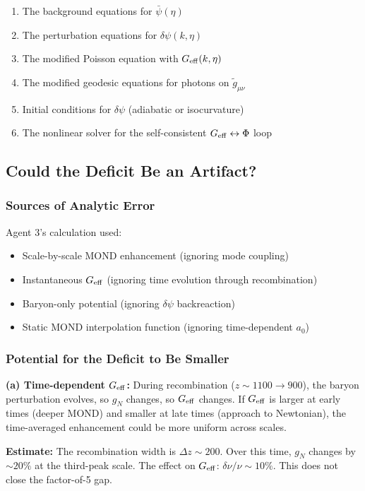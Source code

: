 \documentclass[11pt,a4paper]{article}
\begin{document}
\begin{enumerate}
\item The background equations for $\bar{\psi}(\eta)$
\item The perturbation equations for $\delta\psi(k,\eta)$
\item The modified Poisson equation with $G_{\rm eff}(k,\eta)$
\item The modified geodesic equations for photons on $\tilde{g}_{\mu\nu}$
\item Initial conditions for $\delta\psi$ (adiabatic or isocurvature)
\item The nonlinear solver for the self-consistent $G_{\rm eff} \leftrightarrow \Phi$ loop
\end{enumerate}

\subsection{Could the Deficit Be an Artifact?}

\subsubsection{Sources of Analytic Error}

Agent 3's calculation used:
\begin{itemize}
\item Scale-by-scale MOND enhancement (ignoring mode coupling)
\item Instantaneous $G_{\rm eff}$ (ignoring time evolution through recombination)
\item Baryon-only potential (ignoring $\delta\psi$ backreaction)
\item Static MOND interpolation function (ignoring time-dependent $a_0$)
\end{itemize}

\subsubsection{Potential for the Deficit to Be Smaller}

\textbf{(a) Time-dependent $G_{\rm eff}$:} During recombination ($z \sim 1100 \to 900$), the baryon perturbation evolves, so $g_N$ changes, so $G_{\rm eff}$ changes. If $G_{\rm eff}$ is larger at early times (deeper MOND) and smaller at late times (approach to Newtonian), the time-averaged enhancement could be more uniform across scales.

\textbf{Estimate:} The recombination width is $\Delta z \sim 200$. Over this time, $g_N$ changes by $\sim 20\%$ at the third-peak scale. The effect on $G_{\rm eff}$: $\delta\nu/\nu \sim 10\%$. This does not close the factor-of-5 gap.
\end{document}
